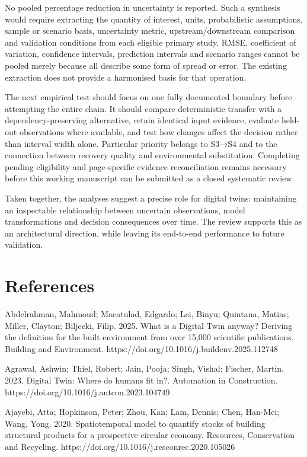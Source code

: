 No pooled percentage reduction in uncertainty is reported. Such a synthesis would require extracting the quantity of interest, units, probabilistic assumptions, sample or scenario basis, uncertainty metric, upstream/downstream comparison and validation conditions from each eligible primary study. RMSE, coefficient of variation, confidence intervals, prediction intervals and scenario ranges cannot be pooled merely because all describe some form of spread or error. The existing extraction does not provide a harmonised basis for that operation.

The next empirical test should focus on one fully documented boundary before attempting the entire chain. It should compare deterministic transfer with a dependency-preserving alternative, retain identical input evidence, evaluate held-out observations where available, and test how changes affect the decision rather than interval width alone. Particular priority belongs to S3→S4 and to the connection between recovery quality and environmental substitution. Completing pending eligibility and page-specific evidence reconciliation remains necessary before this working manuscript can be submitted as a closed systematic review.

Taken together, the analyses suggest a precise role for digital twins: maintaining an inspectable relationship between uncertain observations, model transformations and decision consequences over time. The review supports this as an architectural direction, while leaving its end-to-end performance to future validation.


\section*{References}
Abdelrahman, Mahmoud; Macatulad, Edgardo; Lei, Binyu; Quintana, Matias; Miller, Clayton; Biljecki, Filip. 2025. What is a Digital Twin anyway? Deriving the definition for the built environment from over 15,000 scientific publications. Building and Environment. https://doi.org/10.1016/j.buildenv.2025.112748

Agrawal, Ashwin; Thiel, Robert; Jain, Pooja; Singh, Vishal; Fischer, Martin. 2023. Digital Twin: Where do humans fit in?. Automation in Construction. https://doi.org/10.1016/j.autcon.2023.104749

Ajayebi, Atta; Hopkinson, Peter; Zhou, Kan; Lam, Dennis; Chen, Han-Mei; Wang, Yong. 2020. Spatiotemporal model to quantify stocks of building structural products for a prospective circular economy. Resources, Conservation and Recycling. https://doi.org/10.1016/j.resconrec.2020.105026

